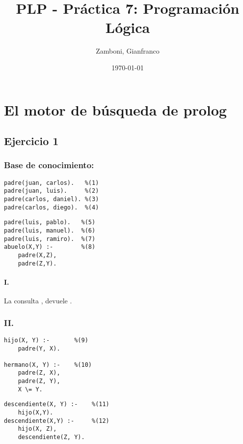 \documentclass[10pt,a4paper]{article}
\begin{document}
  \title{PLP - Práctica 7: Programación Lógica}

  \date{\today}

  \author{Zamboni, Gianfranco}

  \maketitle
  \setcounter{page}{1}


\section*{El motor de búsqueda de prolog}

\subsection{Ejercicio 1}
\subsubsection*{Base de conocimiento:}

\begin{multicols}{2}
\begin{centrado2}
\begin{verbatim}
padre(juan, carlos).   %(1)
padre(juan, luis).     %(2)
padre(carlos, daniel). %(3) 
padre(carlos, diego).  %(4)
\end{verbatim}
\end{centrado2}
\begin{centrado2}
\begin{verbatim}
padre(luis, pablo).   %(5)
padre(luis, manuel).  %(6)
padre(luis, ramiro).  %(7)
abuelo(X,Y) :-        %(8)
    padre(X,Z), 
    padre(Z,Y).
\end{verbatim}
\end{centrado2}
\end{multicols}

\paragraph{I.} La consulta , devuele .

\subsubsection*{II.}
\begin{multicols}{2}
\begin{centrado2}
\begin{verbatim}
hijo(X, Y) :-       %(9)
	padre(Y, X).

hermano(X, Y) :-    %(10)
	padre(Z, X), 
	padre(Z, Y),
	X \= Y.
\end{verbatim}
\end{centrado2}
\vfill\null
\columnbreak
\begin{centrado2}
\begin{verbatim}
descendiente(X, Y) :-    %(11)
	hijo(X,Y).
descendiente(X,Y) :-     %(12)
	hijo(X, Z),
	descendiente(Z, Y).
\end{verbatim}
\end{centrado2}
\end{multicols}
\end{document}
